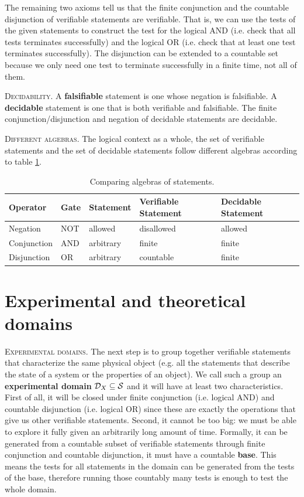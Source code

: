 \documentclass[10pt,twocolumn, nofootinbib]{revtex4-1}
\newcommand\partitle[1]{\textsc{#1}.}
\begin{document}
The remaining two axioms tell us that the finite conjunction and the countable disjunction of verifiable statements are verifiable. That is, we can use the tests of the given statements to construct the test for the logical AND (i.e. check that all tests terminates successfully) and the logical OR (i.e. check that at least one test terminates successfully). The disjunction can be extended to a countable set because we only need one test to terminate successfully in a finite time, not all of them.

\partitle{Decidability} A \textbf{falsifiable} statement is one whose negation is falsifiable. A \textbf{decidable} statement is one that is both verifiable and falsifiable. The finite conjunction/disjunction and negation of decidable statements are decidable.

\partitle{Different algebras} The logical context as a whole, the set of verifiable statements and the set of decidable statements follow different algebras according to table \ref{algebras}.

\begin{table}[h]
	\centering
	\begin{tabular}{p{} p{} p{} p{} p{}}
		Operator & Gate & Statement & Verifiable Statement & Decidable Statement  \\ 
		\hline 
		Negation & NOT & allowed & disallowed & allowed \\ 
		Conjunction & AND & arbitrary  & finite & finite \\ 
		Disjunction & OR & arbitrary  & countable & finite \\ 
	\end{tabular}
	\caption{Comparing algebras of statements.}
	\label{algebras}
\end{table}


\section{Experimental and theoretical domains}

\partitle{Experimental domains} The next step is to group together verifiable statements that characterize the same physical object (e.g. all the statements that describe the state of a system or the properties of an object). We call such a group an \textbf{experimental domain} $\mathcal{D}_X \subseteq \mathcal{S}$ and it will have at least two characteristics. First of all, it will be closed under finite conjunction (i.e. logical AND) and countable disjunction (i.e. logical OR) since these are exactly the operations that give us other verifiable statements. Second, it cannot be too big: we must be able to explore it fully given an arbitrarily long amount of time. Formally, it can be generated from a countable subset of verifiable statements through finite conjunction and countable disjunction, it must have a countable \textbf{base}. This means the tests for all statements in the domain can be generated from the tests of the base, therefore running those countably many tests is enough to test the whole domain.
\end{document}
